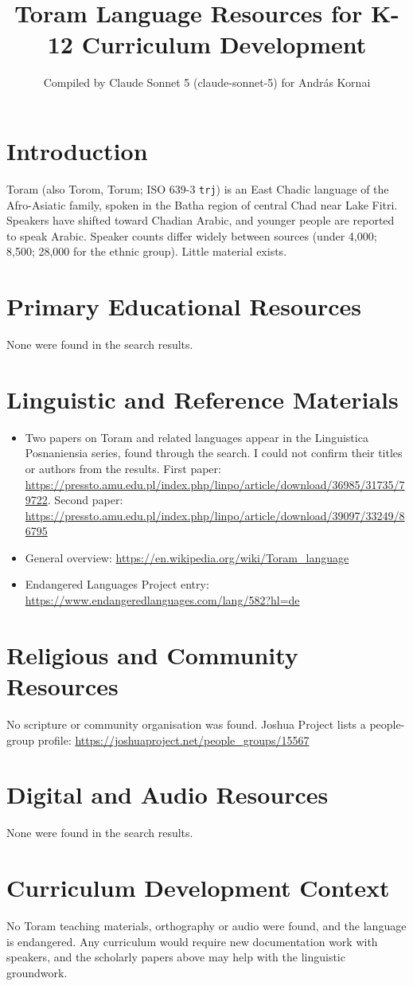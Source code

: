 \documentclass[12pt]{article}
\title{Toram Language Resources for K-12 Curriculum Development}
\author{Compiled by Claude Sonnet 5 (claude-sonnet-5) for Andr\'as Kornai}
\date{}
\begin{document}
\maketitle

\section{Introduction}
Toram (also Torom, Torum; ISO 639-3 \texttt{trj}) is an East Chadic language of the Afro-Asiatic family, spoken in the Batha region of central Chad near Lake Fitri. Speakers have shifted toward Chadian Arabic, and younger people are reported to speak Arabic. Speaker counts differ widely between sources (under 4,000; 8,500; 28,000 for the ethnic group). Little material exists.

\section{Primary Educational Resources}
None were found in the search results.

\section{Linguistic and Reference Materials}
\begin{itemize}
\item Two papers on Toram and related languages appear in the Linguistica Posnaniensia series, found through the search. I could not confirm their titles or authors from the results. First paper: \url{https://pressto.amu.edu.pl/index.php/linpo/article/download/36985/31735/79722}. Second paper: \url{https://pressto.amu.edu.pl/index.php/linpo/article/download/39097/33249/86795}
\item General overview: \url{https://en.wikipedia.org/wiki/Toram_language}
\item Endangered Languages Project entry: \url{https://www.endangeredlanguages.com/lang/582?hl=de}
\end{itemize}

\section{Religious and Community Resources}
No scripture or community organisation was found. Joshua Project lists a people-group profile: \url{https://joshuaproject.net/people_groups/15567}

\section{Digital and Audio Resources}
None were found in the search results.

\section{Curriculum Development Context}
No Toram teaching materials, orthography or audio were found, and the language is endangered. Any curriculum would require new documentation work with speakers, and the scholarly papers above may help with the linguistic groundwork.
\end{document}
